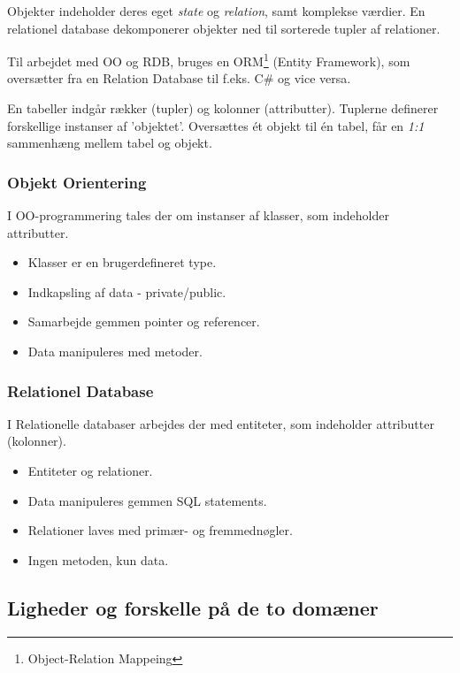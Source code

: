 Objekter indeholder deres eget \textit{state} og \textit{relation}, samt komplekse værdier. En relationel database dekomponerer objekter ned til sorterede tupler af relationer.

Til arbejdet med OO og RDB, bruges en ORM\footnote{Object-Relation Mappeing} (Entity Framework), som oversætter fra en Relation Database til f.eks. C\# og vice versa.

En tabeller indgår rækker (tupler) og kolonner (attributter). 
Tuplerne definerer forskellige instanser af 'objektet'. Oversættes ét objekt til én tabel, får en \textit{1:1} sammenhæng mellem tabel og objekt.

\subsubsection{Objekt Orientering}
I OO-programmering tales der om instanser af klasser, som indeholder attributter.

\begin{itemize}
	\item Klasser er en brugerdefineret type.
	\item Indkapsling af data - private/public.
	\item Samarbejde gemmen pointer og referencer.
	\item Data manipuleres med metoder.
\end{itemize}

\subsubsection{Relationel Database}
I Relationelle databaser arbejdes der med entiteter, som indeholder attributter (kolonner).

\begin{itemize}
	\item Entiteter og relationer.
	\item Data manipuleres gemmen SQL statements.
	\item Relationer laves med primær- og fremmednøgler.
	\item Ingen metoden, kun data.
\end{itemize}



\subsection{Ligheder og forskelle på de to domæner}

